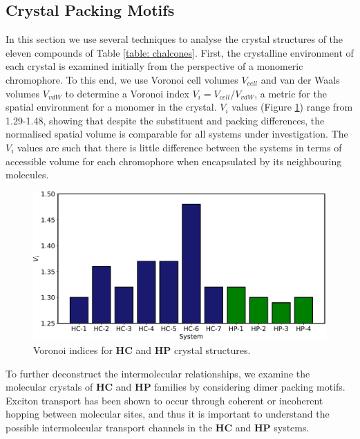 \subsection{Crystal Packing Motifs} \label{section: Connecting_Motifs}
In this section we use several techniques to analyse the crystal structures of the eleven compounds of Table \ref{table: chalcones}. First, the crystalline environment of each crystal is examined initially from the perspective of a monomeric chromophore. To this end, we use Voronoi cell volumes $V_{cell}$ and van der Waals volumes $V_{vdW}$ to determine a Voronoi index $V_{i}=V_{cell}/V_{vdW}$, a metric for the spatial environment for a monomer in the crystal. $V_{i}$ values (Figure \ref{figure: voronoi_index}) range from 1.29-1.48, showing that despite the substituent and packing differences, the  normalised spatial volume is comparable for all systems under investigation.  The $V_{i}$ values are such that there is little difference between the systems in terms of accessible volume for each chromophore when encapsulated by its neighbouring molecules.
\begin{figure}[H]
\centering
  \includegraphics[width=0.8\linewidth]{5ConnectingCrystalStructure/Voronoi_Index}
  \caption{Voronoi indices for \textbf{HC} and \textbf{HP} crystal structures.}
  \label{figure: voronoi_index}
\end{figure}
To further deconstruct the intermolecular relationships, we examine the molecular crystals of \textbf{HC} and \textbf{HP} families by considering dimer packing motifs. Exciton transport has been shown to occur through coherent or incoherent hopping between molecular sites, and thus it is important to understand the possible intermolecular transport channels in the \textbf{HC} and \textbf{HP} systems.

